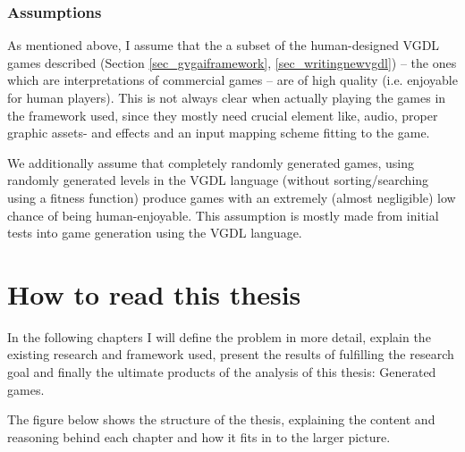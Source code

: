 \documentclass[a4paper,titlepage,final]{report}
\begin{document}
\subsubsection*{Assumptions}
As mentioned above, I assume that the a subset of the human-designed VGDL games described (Section \ref{sec_gvgaiframework}, \ref{sec_writingnewvgdl}) -- the ones which are interpretations of commercial games -- are of high quality (i.e. enjoyable for human players). 
This is not always clear when actually playing the games in the framework used, since they mostly need crucial element like, audio, proper graphic assets- and effects and an input mapping scheme fitting to the game.

We additionally assume that completely randomly generated games, using randomly generated levels in the VGDL language (without sorting/searching using a fitness function) produce games with an extremely (almost negligible) low chance of being human-enjoyable.
This assumption is mostly made from initial tests into game generation using the VGDL language.


\section{How to read this thesis}
\label{sec_howtoread}
In the following chapters I will define the problem in more detail, explain the existing research and framework used, present the results of fulfilling the research goal and finally the ultimate products of the analysis of this thesis: Generated games.

The figure below shows the structure of the thesis, explaining the content and reasoning behind each chapter and how it fits in to the larger picture.
\end{document}
